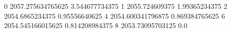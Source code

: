 0 2057.275634765625 3.544677734375
1 2055.724609375 1.99365234375
2 2054.6865234375 0.95556640625
4 2054.600341796875 0.869384765625
6 2054.545166015625 0.814208984375
8 2053.73095703125 0.0
